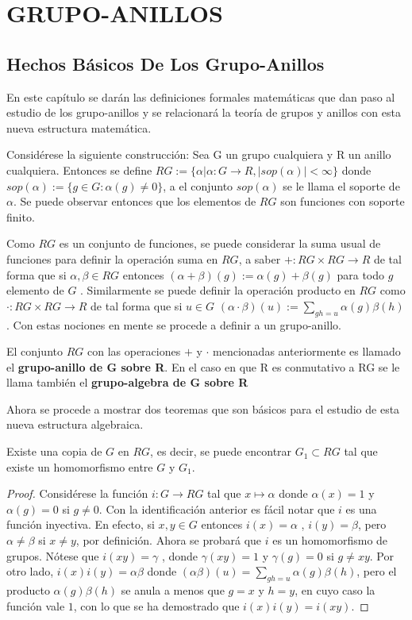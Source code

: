 \chapter{GRUPO-ANILLOS}

\section{Hechos Básicos De Los Grupo-Anillos}
En este capítulo se darán las definiciones formales matemáticas que dan paso al estudio de los grupo-anillos y se relacionará la teoría de grupos y anillos con esta nueva estructura matemática.

Considérese la siguiente construcción: Sea G un grupo cualquiera y R un anillo cualquiera. Entonces se define $RG:=\{\alpha | \alpha \colon  G \to R , |sop(\alpha)|< \infty \}$ donde $sop(\alpha):=\{g \in G: \alpha (g)\neq 0\}$, a el conjunto $sop(\alpha)$ se le llama el soporte de $\alpha$. Se puede observar entonces que los elementos de $RG$ son funciones con soporte finito. 

Como $RG$ es un conjunto de funciones, se puede considerar la suma usual de funciones para definir la operación suma en $RG$, a saber $+ \colon RG\times RG \to R $ de tal forma que si $\alpha, \beta \in RG$ entonces $(\alpha +\beta)(g):=\alpha(g)+\beta(g)$ para todo $g$ elemento de $G$ . Similarmente se puede definir la operación producto en $RG$ como $\cdot \colon RG \times RG \to R$ de tal forma que si $u\in G$ $(\alpha \cdot \beta )(u):= \sum_{gh=u}\alpha(g)\beta(h) $. Con estas nociones en mente   se procede a definir a un grupo-anillo. 
\begin{definicion}
El conjunto $RG$ con las operaciones $+$ y $\cdot$ mencionadas anteriormente es llamado el \textbf{grupo-anillo de G sobre R}. En el caso en que R es conmutativo a RG se le llama también el \textbf{grupo-algebra de G sobre R} 
\end{definicion}

Ahora se procede a mostrar dos teoremas que son básicos para el estudio de esta nueva estructura algebraica.

\begin{teorema}
Existe una copia de $G$ en $RG$, es decir, se puede encontrar $G_1 \subset RG$ tal que existe  un homomorfismo entre $G$ y $G_1$.  
\end{teorema}

\begin{proof}
Considérese la función $i \colon G \to RG$ tal que $x \mapsto \alpha$ donde $\alpha(x)=1$ y $\alpha(g)=0$ si $g\neq 0$. Con la identificación anterior es fácil notar que $i$ es una función inyectiva.
En efecto, si $x,y \in G$ entonces $i(x)=\alpha$ , $i(y)=\beta$, pero $\alpha \neq \beta$ si $x \neq y$, por definición.
Ahora se probará que $i$ es un homomorfismo de grupos. Nótese que $i(xy)=\gamma$ , donde $\gamma(xy)=1$ y $\gamma(g)=0$ si $g \neq xy$. Por otro lado, $i(x)i(y)=\alpha\beta$ donde $(\alpha\beta)(u)= \sum_{gh=u}\alpha(g)\beta(h)  $, pero el producto $ \alpha(g)\beta(h)  $ se anula a menos que  $g=x$ y $h=y$, en cuyo caso la función vale $1$, con lo que se ha demostrado que  $i(x)i(y)=i(xy)$. 
\end{proof}


